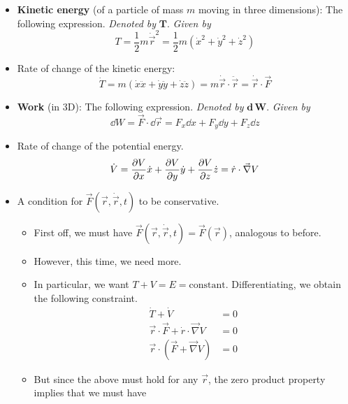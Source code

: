 \documentclass[../notes.tex]{subfiles}
\begin{document}
\begin{itemize}
    \item \textbf{Kinetic energy} (of a particle of mass $m$ moving in three dimensions): The following expression. \emph{Denoted by} $\bm{T}$. \emph{Given by}
    \begin{equation*}
        T = \frac{1}{2}m\dot{\vec{r}}^2
        = \frac{1}{2}m(\dot{x}^2+\dot{y}^2+\dot{z}^2)
    \end{equation*}
    \item Rate of change of the kinetic energy:
    \begin{equation*}
        \dot{T} = m(\dot{x}\ddot{x}+\dot{y}\ddot{y}+\dot{z}\ddot{z})
        = m\dot{\vec{r}}\cdot\ddot{\vec{r}}
        = \dot{\vec{r}}\cdot\vec{F}
    \end{equation*}
    \item \textbf{Work} (in 3D): The following expression. \emph{Denoted by} $\bm{\textbf{d}\,W}$. \emph{Given by}
    \begin{equation*}
        \dd{W} = \vec{F}\cdot\dd{\vec{r}}
        = F_x\dd{x}+F_y\dd{y}+F_z\dd{z}
    \end{equation*}
    \item Rate of change of the potential energy.
    \begin{equation*}
        \dot{V} = \pdv{V}{x}\dot{x}+\pdv{V}{y}\dot{y}+\pdv{V}{z}\dot{z}
        = \dot{r}\cdot\vec{\nabla}V
    \end{equation*}
    \item A condition for $\vec{F}(\vec{r},\dot{\vec{r}},t)$ to be conservative.
    \begin{itemize}
        \item First off, we must have $\vec{F}(\vec{r},\dot{\vec{r}},t)=\vec{F}(\vec{r})$, analogous to before.
        \item However, this time, we need more.
        \item In particular, we want $T+V=E=\text{constant}$. Differentiating, we obtain the following constraint.
        \begin{align*}
            \dot{T}+\dot{V} &= 0\\
            \vec{r}\cdot\vec{F}+\dot{r}\cdot\vec{\nabla}V &= 0\\
            \vec{r}\cdot(\vec{F}+\vec{\nabla}V) &= 0
        \end{align*}
        \item But since the above must hold for any $\vec{r}$, the zero product property implies that we must have
        \begin{align*}

\end{align*}
\end{itemize}
\end{itemize}
\end{document}
